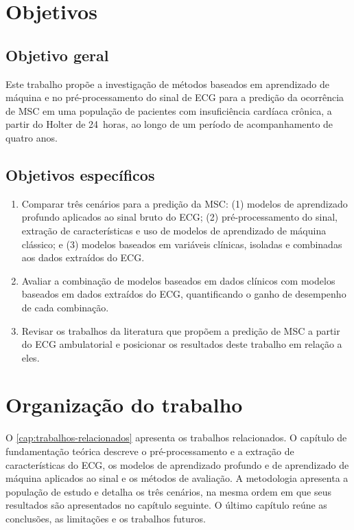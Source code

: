 \section{Objetivos}
\label{sec:intro-objetivo}

\subsection{Objetivo geral}
\label{subsec:intro-objetivo-geral}

Este trabalho propõe a investigação de métodos baseados em aprendizado de
máquina e no pré-processamento do sinal de \gls{ECG} para a predição da
ocorrência de \gls{MSC} em uma população de pacientes com insuficiência
cardíaca crônica, a partir do Holter de 24~horas, ao longo de um período de
acompanhamento de quatro anos.

\subsection{Objetivos específicos}
\label{subsec:intro-objetivos-especificos}

\begin{enumerate}
	\item[(i)] Comparar três cenários para a predição da \gls{MSC}: (1) modelos de
	      aprendizado profundo aplicados ao sinal bruto do \gls{ECG}; (2)
	      pré-processamento do sinal, extração de características e uso de
	      modelos de aprendizado de máquina clássico; e (3) modelos baseados
	      em variáveis clínicas, isoladas e combinadas aos dados extraídos do
	      \gls{ECG}.
	\item[(ii)] Avaliar a combinação de modelos baseados em dados clínicos com
	      modelos baseados em dados extraídos do \gls{ECG}, quantificando o
	      ganho de desempenho de cada combinação.
	\item[(iii)] Revisar os trabalhos da literatura que propõem a predição de
	      \gls{MSC} a partir do \gls{ECG} ambulatorial e posicionar os
	      resultados deste trabalho em relação a eles.
\end{enumerate}

\section{Organização do trabalho}
\label{sec:intro-organizacao}

O \autoref{cap:trabalhos-relacionados} apresenta os trabalhos relacionados.
O capítulo de fundamentação teórica descreve o pré-processamento e a
extração de características do \gls{ECG}, os modelos de aprendizado profundo
e de aprendizado de máquina aplicados ao sinal e os métodos de avaliação. A
metodologia apresenta a população de estudo e detalha os três cenários, na
mesma ordem em que seus resultados são apresentados no capítulo seguinte. O
último capítulo reúne as conclusões, as limitações e os trabalhos futuros.
